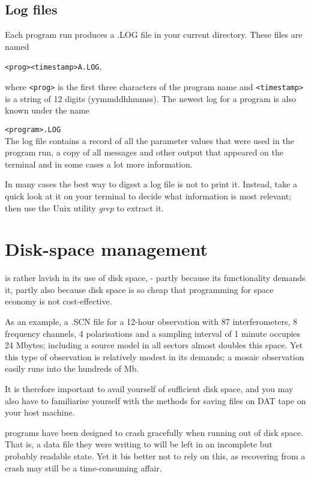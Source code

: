 \subsection{ Log files }
\label{.log.files}

	Each program run produces a .LOG file in your current directory. These
files are named

	\verb/<prog><timestamp>A.LOG/,

where \verb/<prog>/ is the first three characters of the program name and
\verb/<timestamp>/ is a string of 12 digits (yymmddhhmmss). The newest log for
a program is also known under the name

	\verb/<program>.LOG/
\\
The log file contains a record of all the parameter values that were used in
the program run, a copy of all messages and other output that appeared on the
terminal and in some cases a lot more information.

	In many cases the best way to digest a log file is not to print it.
Instead, take a quick look at it on your terminal to decide what information is
most relevant; then use the Unix utility {\em grep} to extract it.


\section{ Disk-space management }

	\NEWSTAR is rather lavish in its use of disk space, - partly because
its functionality demands it, partly also because disk space is so cheap that
programming for space economy is not cost-effective.

	As an example, a .SCN file for a 12-hour observation with 87
interferometers, 8 frequency channels, 4 polarisations and a sampling interval
of 1 minute occupies 24 Mbytes; including a source model in all sectors almost
doubles this space. Yet this type of observation is relatively modest in its
demands; a mosaic observation easily runs into the hundreds of Mb.

	It is therefore important to avail yourself of sufficient disk space,
and you may also have to familiarise yourself with the methods for saving files
on DAT tape on your host machine.

	\NEWSTAR programs have been designed to crash gracefully when running
out of disk space. That is, a data file they were writing to will be left in an
incomplete but probably readable state. Yet it bis better not to rely on this,
as recovering from a crash may still be a time-consuming affair.



